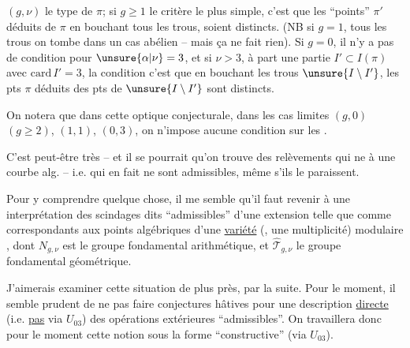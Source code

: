  $(g,\nu)$ le type de $\pi$;  si $g\geq1$ le critère le plus simple, c'est que les ``\inserted{$\Gamma^{\natural}$-}points''  $\pi'$ déduits de $\pi$ en bouchant tous les trous, soient distincts.  (NB si $g=1$,    tous les trous on tombe dans un cas abélien -- mais ça ne fait rien). Si $g=0$,  il n'y a pas de condition pour $\unsure{\alpha|\nu}=3$, et si $\nu>3$,  à part une  partie $I'\subset I(\pi)$ avec $\mathrm{card}\,I'=3$, la condition c'est que en bouchant les trous  $\unsure{I\setminus I'}$, les \inserted{$\Gamma^{\natural}$-}pts  $\pi$ déduits des pts de $\unsure{I\setminus I'}$ sont distincts.

On notera que dans cette optique conjecturale, dans les cas limites $(g,0)$ $(g\geq2)$, $(1,1)$, $(0,3)$, on n'impose aucune condition  sur les .



C'est peut-être très  -- et il se pourrait qu'on trouve des relèvements qui ne   à une courbe alg. -- i.e. qui en fait ne sont  admissibles, même s'ils le paraissent.

Pour y comprendre quelque chose, il me semble qu'il faut revenir à une interprétation des  scindages dits ``admissibles'' d'une extension telle que
comme correspondants aux points algébriques d'une \uline{variété} (, une multiplicité) modulaire , dont $N_{g,\nu}$ est le groupe fondamental arithmétique, et $\widehat{\mathcal T}_{g,\nu}$ le groupe fondamental géométrique.

J'aimerais examiner cette situation de plus près, par la suite. Pour le moment, il semble prudent de ne pas faire  conjectures hâtives pour  une description \uline{directe} (i.e. \uline{pas} via $U_{03}$) des opérations extérieures ``admissibles''. On travaillera donc pour le moment  cette notion sous la forme ``constructive'' (via $U_{03}$).

